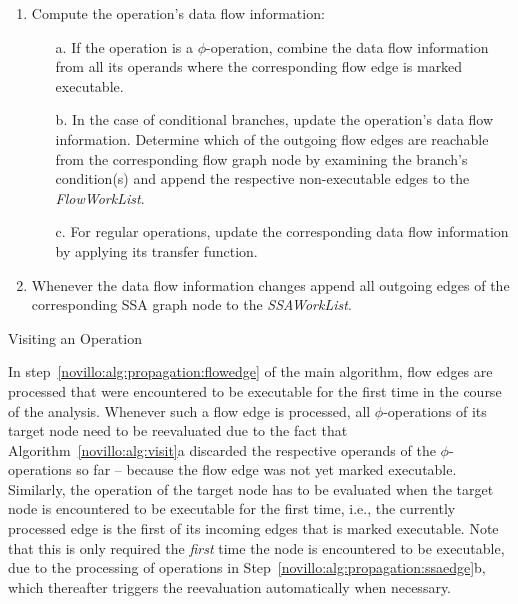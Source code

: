 \begin{algorithm}[t!]
  \begin{enumerate}
    \item Compute the operation's data flow information:
    \begin{enumerate}
      \item[a.] \label{novillo:alg:visit:phi} If the operation is a
                $\phi$-operation, combine the data flow information from all its
                operands where the corresponding flow edge is marked executable.
      \item[b.] \label{novillo:alg:visit:branch} In the case of conditional
                branches, update the operation's data flow information. Determine
                which of the outgoing flow edges are reachable from the
                corresponding flow graph node by examining the branch's
                condition(s) and append the respective non-executable edges to
                the \emph{FlowWorkList}.
      \item[c.] \label{novillo:alg:visit:regular} For regular operations, update
                the corresponding data flow information by applying its transfer
                function.
    \end{enumerate}
    \item Whenever the data flow information changes append all outgoing edges
          of the corresponding SSA graph node to the \emph{SSAWorkList}.
    \vspace{-1em}
  \end{enumerate}
  \caption{Visiting an Operation}
  \label{novillo:alg:visit}
\end{algorithm}

In step~\ref{novillo:alg:propagation:flowedge} of the main algorithm, flow edges
are processed that were encountered to be executable for the first time in the
course of the analysis. Whenever such a flow edge is processed, all
$\phi$-operations of its target node need to be reevaluated due to the fact that
Algorithm~\ref{novillo:alg:visit}a discarded the respective operands of the
$\phi$-operations so far -- because the flow edge was not yet marked executable.
Similarly, the operation of the target node has to be evaluated when the target
node is encountered to be executable for the first time, i.e., the currently
processed edge is the first of its incoming edges that is marked executable.
Note that this is only required the \emph{first} time the node is
encountered to be executable, due to the processing of operations in
Step~\ref{novillo:alg:propagation:ssaedge}b, which thereafter triggers the
reevaluation automatically when necessary.

